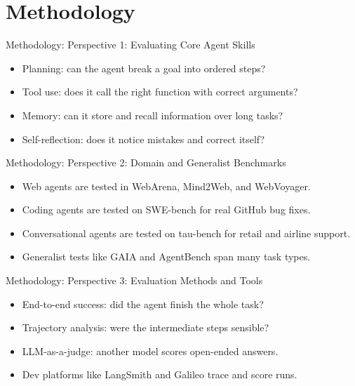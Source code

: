 \documentclass[10pt]{beamer}
\begin{document}
\section{Methodology}
\begin{frame}[allowframebreaks]{Methodology: Perspective 1: Evaluating Core Agent Skills}
\begin{itemize}
  \item Planning: can the agent break a goal into ordered steps?
  \item Tool use: does it call the right function with correct arguments?
  \item Memory: can it store and recall information over long tasks?
  \item Self-reflection: does it notice mistakes and correct itself?
\end{itemize}
\end{frame}
\begin{frame}[allowframebreaks]{Methodology: Perspective 2: Domain and Generalist Benchmarks}
\begin{itemize}
  \item Web agents are tested in WebArena, Mind2Web, and WebVoyager.
  \item Coding agents are tested on SWE-bench for real GitHub bug fixes.
  \item Conversational agents are tested on tau-bench for retail and airline support.
  \item Generalist tests like GAIA and AgentBench span many task types.
\end{itemize}
\end{frame}
\begin{frame}[allowframebreaks]{Methodology: Perspective 3: Evaluation Methods and Tools}
\begin{itemize}
  \item End-to-end success: did the agent finish the whole task?
  \item Trajectory analysis: were the intermediate steps sensible?
  \item LLM-as-a-judge: another model scores open-ended answers.
  \item Dev platforms like LangSmith and Galileo trace and score runs.
\end{itemize}
\end{frame}
\end{document}
